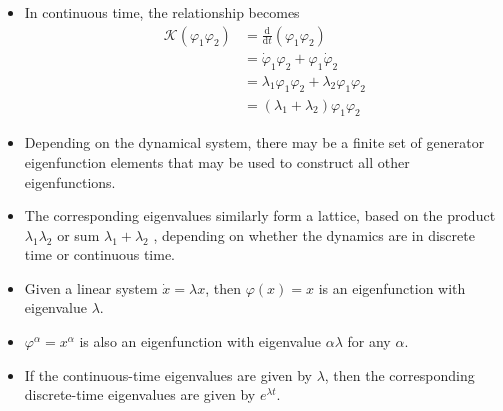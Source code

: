 \documentclass[hyperref={pdfpagemode=FullScreen},aspectratio=169]{beamer}
\begin{document}
\begin{frame}{}
\begin{itemize}
\setlength\itemsep{1em}
\item In continuous time, the relationship becomes
\begin{align}
    \mathcal{K}(\varphi_1\varphi_2) &= \frac{\mathrm{d}}{\mathrm{d}t}(\varphi_1\varphi_2) \nonumber \\
    &= \dot{\varphi}_1\varphi_2 + \varphi_1\dot{\varphi}_2 \nonumber \\
    &= \lambda_1\varphi_1\varphi_2 + \lambda_2\varphi_1\varphi_2 \nonumber \\
    &= (\lambda_1 + \lambda_2)\varphi_1\varphi_2
\end{align}
\item Depending on the dynamical system, there may be a finite set of generator eigenfunction elements that may be used to construct all other eigenfunctions.
\item The corresponding eigenvalues similarly form a lattice, based on the product $\lambda_1 \lambda_2$ or sum $\lambda_1 + \lambda_2$ , depending on whether the dynamics are in discrete time or continuous time. 
\item Given a linear system $\dot{x} = \lambda x$, then $\varphi(x) = x$ is an eigenfunction with eigenvalue $\lambda$.
\item $\varphi^{\alpha} = x^{\alpha}$ is also an eigenfunction with eigenvalue $\alpha\lambda$ for any $\alpha$.
\item If the continuous-time eigenvalues are given by $\lambda$, then the corresponding discrete-time eigenvalues are given by $e^{\lambda t}$.
\end{itemize}
\end{frame}
\end{document}
